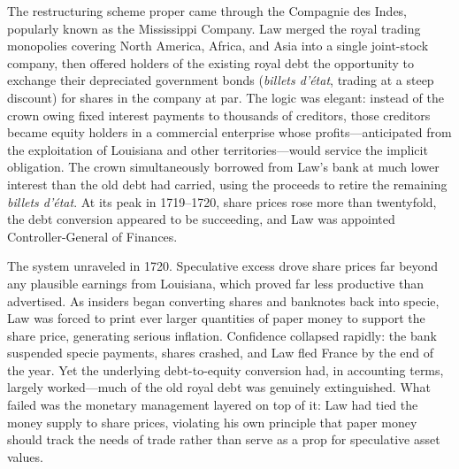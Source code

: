\documentclass[12pt]{article}
\begin{document}
The restructuring scheme proper came through the Compagnie des Indes, popularly known as the Mississippi Company. Law merged the royal trading monopolies covering North America, Africa, and Asia into a single joint-stock company, then offered holders of the existing royal debt the opportunity to exchange their depreciated government bonds (\textit{billets d'état}, trading at a steep discount) for shares in the company at par. The logic was elegant: instead of the crown owing fixed interest payments to thousands of creditors, those creditors became equity holders in a commercial enterprise whose profits---anticipated from the exploitation of Louisiana and other territories---would service the implicit obligation. The crown simultaneously borrowed from Law's bank at much lower interest than the old debt had carried, using the proceeds to retire the remaining \textit{billets d'état}. At its peak in 1719--1720, share prices rose more than twentyfold, the debt conversion appeared to be succeeding, and Law was appointed Controller-General of Finances.

The system unraveled in 1720. Speculative excess drove share prices far beyond any plausible earnings from Louisiana, which proved far less productive than advertised. As insiders began converting shares and banknotes back into specie, Law was forced to print ever larger quantities of paper money to support the share price, generating serious inflation. Confidence collapsed rapidly: the bank suspended specie payments, shares crashed, and Law fled France by the end of the year. Yet the underlying debt-to-equity conversion had, in accounting terms, largely worked---much of the old royal debt was genuinely extinguished. What failed was the monetary management layered on top of it: Law had tied the money supply to share prices, violating his own principle that paper money should track the needs of trade rather than serve as a prop for speculative asset values.



\end{document}
